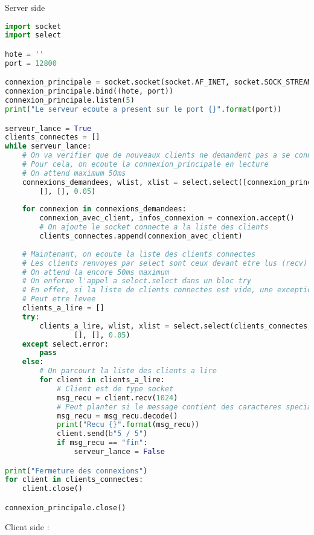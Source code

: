 \documentclass[a4paper, 12pt, titlepage]{scrartcl} %
\begin{document}
Server side
\begin{lstlisting}[language=Python]
import socket
import select

hote = ''
port = 12800

connexion_principale = socket.socket(socket.AF_INET, socket.SOCK_STREAM)
connexion_principale.bind((hote, port))
connexion_principale.listen(5)
print("Le serveur ecoute a present sur le port {}".format(port))

serveur_lance = True
clients_connectes = []
while serveur_lance:
    # On va verifier que de nouveaux clients ne demandent pas a se connecter
    # Pour cela, on ecoute la connexion_principale en lecture
    # On attend maximum 50ms
    connexions_demandees, wlist, xlist = select.select([connexion_principale],
        [], [], 0.05)
    
    for connexion in connexions_demandees:
        connexion_avec_client, infos_connexion = connexion.accept()
        # On ajoute le socket connecte a la liste des clients
        clients_connectes.append(connexion_avec_client)
    
    # Maintenant, on ecoute la liste des clients connectes
    # Les clients renvoyes par select sont ceux devant etre lus (recv)
    # On attend la encore 50ms maximum
    # On enferme l'appel a select.select dans un bloc try
    # En effet, si la liste de clients connectes est vide, une exception
    # Peut etre levee
    clients_a_lire = []
    try:
        clients_a_lire, wlist, xlist = select.select(clients_connectes,
                [], [], 0.05)
    except select.error:
        pass
    else:
        # On parcourt la liste des clients a lire
        for client in clients_a_lire:
            # Client est de type socket
            msg_recu = client.recv(1024)
            # Peut planter si le message contient des caracteres speciaux
            msg_recu = msg_recu.decode()
            print("Recu {}".format(msg_recu))
            client.send(b"5 / 5")
            if msg_recu == "fin":
                serveur_lance = False

print("Fermeture des connexions")
for client in clients_connectes:
    client.close()

connexion_principale.close()
\end{lstlisting} \vspace{5mm}
Client side :
\end{document}
